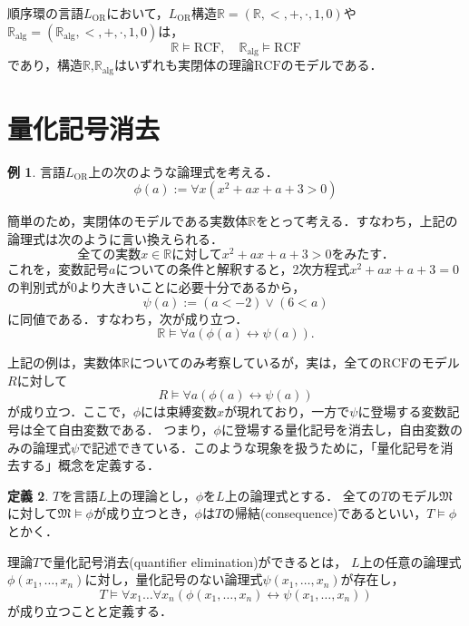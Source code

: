 \documentclass[uplatex, dvipdfmx]{jsarticle}
\numberwithin{equation}{section}
\newcommand{\R}{\mathbb{R}}
\newcommand{\Ralg}{\mathbb{R}_\mathrm{alg}}
\newcommand{\M}{\mathfrak{M}}
\newcommand{\RCF}{\mathrm{RCF}}
\theoremstyle{definition}
\newtheorem{definition}{定義}[section]
\newtheorem{example}[definition]{例}
\begin{document}
順序環の言語$L_{\mathrm{OR}}$において，$L_\mathrm{OR}$構造$\R=(\R,<,+,\cdot,1,0)$や$\Ralg=(\Ralg,<,+,\cdot,1,0)$は，
\begin{equation}
     \R \models \RCF, \quad \Ralg \models \RCF
\end{equation}
であり，構造$\R$,$\Ralg$はいずれも実閉体の理論$\RCF$のモデルである．

\section{量化記号消去}

\begin{example}
     言語$L_\mathrm{OR}$上の次のような論理式を考える．
     \begin{equation}
          \phi(a) := \forall x (x^2 + ax + a + 3 > 0)
     \end{equation}

     簡単のため，実閉体のモデルである実数体$\R$をとって考える．すなわち，上記の論理式は次のように言い換えられる．
     \begin{equation}
          \text{全ての実数$x \in \R$に対して$x^2 + ax + a + 3 > 0$をみたす．}  
     \end{equation}
     これを，変数記号$a$についての条件と解釈すると，2次方程式$x^2 + ax + a + 3 = 0$の判別式が0より大きいことに必要十分であるから，
     \begin{equation}
          \psi(a) := (a < -2) \lor (6 < a)
     \end{equation}
     に同値である．すなわち，次が成り立つ．
     \begin{equation}
          \R \models \forall a (\phi(a) \leftrightarrow \psi(a)).
     \end{equation}
\end{example}

上記の例は，実数体$\R$についてのみ考察しているが，実は，全ての$\RCF$のモデル$R$に対して
\begin{equation}
     R \models \forall a (\phi(a) \leftrightarrow \psi(a))
\end{equation}
が成り立つ．ここで，$\phi$には束縛変数$x$が現れており，一方で$\psi$に登場する変数記号は全て自由変数である．
つまり，$\phi$に登場する量化記号を消去し，自由変数のみの論理式$\psi$で記述できている．このような現象を扱うために，「量化記号を消去する」概念を定義する．


\begin{definition}
$T$を言語$L$上の理論とし，$\phi$を$L$上の論理式とする．
全ての$T$のモデル$\M$に対して$\M \models \phi$が成り立つとき，$\phi$は$T$の帰結(consequence)であるといい，$T \models \phi$とかく．

理論$T$で量化記号消去(quantifier elimination)ができるとは，
$L$上の任意の論理式$\phi(x_1,\dots,x_n)$に対し，量化記号のない論理式$\psi(x_1,\dots, x_n)$が存在し，
\begin{equation}
     T \models \forall x_1 \dots \forall x_n(\phi(x_1,\dots,x_n) \leftrightarrow \psi(x_1, \dots, x_n))
\end{equation}
が成り立つことと定義する．
\end{definition}
\end{document}
